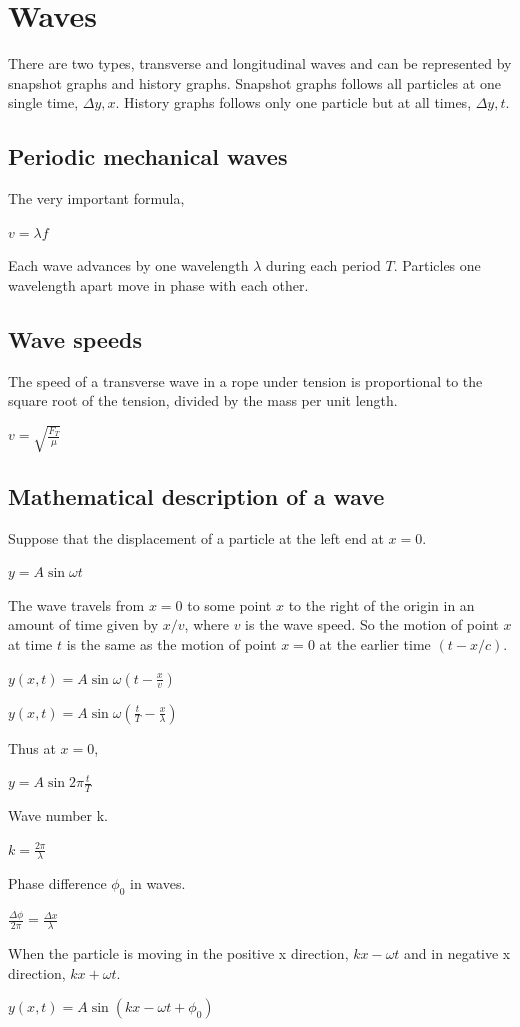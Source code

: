 \documentclass[a4paper]{article}
\begin{document}
\section{Waves}
There are two types, transverse and longitudinal waves and can be represented by snapshot graphs and history graphs.
\newline 
Snapshot graphs follows all particles at one single time, $\Delta y , x$.
\newline
History graphs follows only one particle but at all times, $\Delta y, t$.
\subsection{Periodic mechanical waves}
The very important formula,
\begin{center}
$v = \lambda f$
\end{center}
Each wave advances by one wavelength $\lambda$ during each period $T$. Particles one wavelength apart move in phase with each other. 
\subsection{Wave speeds}
The speed of a transverse wave in a rope under tension is proportional to the square root of the tension, divided by the mass per unit length.
\begin{center}
$v = \displaystyle\sqrt{\frac{F_{T}}{\mu}}$
\end{center}
\subsection{Mathematical description of a wave}
Suppose that the displacement of a particle at the left end at $x = 0$.
\begin{center}
$y = A\sin{\omega t}$
\end{center}
The wave travels from $x = 0$ to some point $x$ to the right of the origin in an amount of time given by $x/v$, where $v$ is the wave speed. So the motion of point $x$ at time $t$ is the same as the motion of point $x = 0$ at the earlier time $(t - x/c)$. 
\begin{center}
$y(x,t) = \displaystyle A\sin{\omega \left(t-\frac{x}{v}\right)}$
\end{center}
\begin{center}
$y(x,t) = \displaystyle A\sin{\omega \left(\frac{t}{T}-\frac{x}{\lambda}\right)}$
\end{center}
Thus at $x = 0$,
\begin{center}
$y = \displaystyle A\sin{2\pi\frac{t}{T}}$
\end{center}
Wave number k.
\begin{center}
$k = \displaystyle\frac{2\pi}{\lambda}$
\end{center}
Phase difference $\phi_0$ in waves.
\begin{center}
$\displaystyle\frac{\Delta\phi}{2\pi} = \frac{\Delta x}{\lambda}$
\end{center}
When the particle is moving in the positive x direction, $kx-\omega t$ and in negative x direction, $kx+\omega t$.
\begin{center}
$y(x,t) = \displaystyle A\sin{(kx-\omega t + \phi_0)}$
\end{center}
\end{document}
